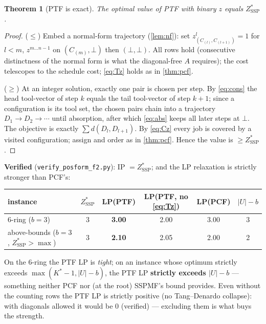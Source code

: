 \documentclass[11pt,a4paper]{article}
\theoremstyle{plain}
\newtheorem{theorem}{Theorem}[section]
\theoremstyle{definition}
\newcommand{\ZSSP}{Z_{\mathrm{SSP}}^{*}}
\begin{document}
\begin{thmbox}
\begin{theorem}[PTF is exact]
\label{thm:ptf}
The optimal value of PTF with binary $z$ equals $\ZSSP$.
\end{theorem}
\end{thmbox}
\begin{proofbox}
\begin{proof}
($\le$) Embed a normal-form trajectory (\cref{lem:nf}): set
$z^l_{(C_{(l)},C_{(l+1)})}=1$ for $l<m$, $z^{m\dots n-1}$ on $(C_{(m)},\bot)$ then
$(\bot,\bot)$. All rows hold (consecutive distinctness of the normal form is what
the diagonal-free $A$ requires); the cost telescopes to the schedule cost;
\eqref{eq:Tz} holds as in \cref{thm:pcf}.

($\ge$) At an integer solution, exactly one pair is chosen per step. By
\eqref{eq:cons} the head tool-vector of step $k$ equals the tail tool-vector of step
$k{+}1$; since a configuration is its tool set, the chosen pairs chain into a
trajectory $D_1\to D_2\to\cdots$ until absorption, after which \eqref{eq:abs} keeps
all later steps at $\bot$. The objective is exactly $\sum d(D_l,D_{l+1})$. By
\eqref{eq:Cz} every job is covered by a visited configuration; assign and order as in
\cref{thm:pcf}. Hence the value is $\ge\ZSSP$.
\end{proof}
\end{proofbox}

\begin{warnbox}
\textbf{Verified} (\texttt{verify\_posform\_f2.py}): IP $=\ZSSP$; and the LP
relaxation is strictly stronger than PCF's:
\begin{center}
\renewcommand{\arraystretch}{1.2}
\begin{tabular}{lccccc}
\toprule
instance & $\ZSSP$ & LP(PTF) & LP(PTF, no \eqref{eq:Tz}) & LP(PCF) & $|U|-b$\\
\midrule
$6$-ring ($b{=}3$) & 3 & \textbf{3.00} & 2.00 & 3.00 & 3\\
above-bounds ($b{=}3$, $\ZSSP>\max$) & 3 & \textbf{2.10} & 2.05 & 2.00 & 2\\
\bottomrule
\end{tabular}
\end{center}
On the $6$-ring the PTF LP is \emph{tight}; on an instance whose optimum strictly
exceeds $\max(K^*{-}1,|U|-b)$, the PTF LP \textbf{strictly exceeds $|U|-b$} ---
something neither PCF nor (at the root) SSPMF's bound provides. Even without the
counting rows the PTF LP is strictly positive (no Tang--Denardo collapse): with
diagonals allowed it would be $0$ (verified) --- excluding them is what buys the
strength.
\end{warnbox}
\end{document}
